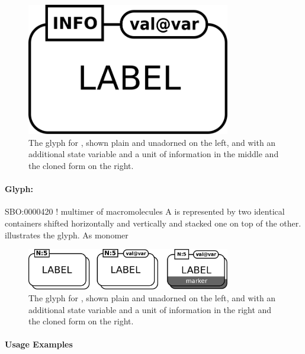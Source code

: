 \begin{figure}[htb]
  \centering
  \includegraphics[width = 3.5in]{images/macromolecule}
  \caption{The \PD glyph for , shown plain and
    unadorned on the left, and with an additional state variable and a
    unit of information in the middle and the cloned form on the right.}
  \label{fig:techref:macromolecule}
\end{figure}

\paragraph{Glyph: }

\begin{glyphDescription}
\glyphSboTerm SBO:0000420 ! multimer of macromolecules
\glyphContainer A  is represented by two identical containers shifted horizontally and vertically and stacked one on top of the other.   illustrates the glyph.
\glyphLabel As monomer
\end{glyphDescription}

\begin{figure}[htb]
  \centering
  \includegraphics[width = 3.5in]{images/macromolMultimer}
  \caption{The \PD glyph for , shown plain and
    unadorned on the left, and with an additional state variable and a
    unit of information in the right and the cloned form on the right.}
  \label{fig:techref:macromolMultimer}
\end{figure}

\paragraph{Usage Examples}
\label{sec:techref:CplxEPNs}

